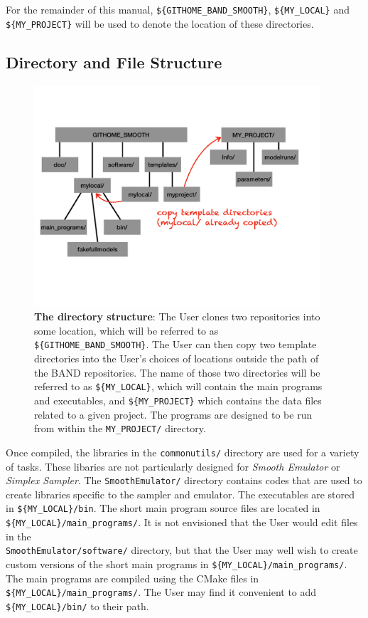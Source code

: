 \documentclass[UserManual.tex]{subfiles}
\begin{document}
For the remainder of this manual, {\tt \$\{GITHOME\_BAND\_SMOOTH\}}, {\tt \$\{MY\_LOCAL\}} and {\tt \$\{MY\_PROJECT\}} will be used to denote the location of these directories.

\subsection{Directory and File Structure}

\begin{figure}
\centerline{\includegraphics[width = 0.95\textwidth]{directorystructure}}
\caption{{\bf The directory structure}: The User clones two repositories into some location, which will be referred to as {\tt \$\{GITHOME\_BAND\_SMOOTH\}}. The User can then copy two template directories into the User's choices of locations outside the path of the BAND repositories. The name of those two directories will be referred to as {\tt \$\{MY\_LOCAL\}}, which will contain the main programs and executables, and {\tt \$\{MY\_PROJECT\}} which contains the data files related to a given project. The programs are designed to be run from within the {\tt MY\_PROJECT/} directory.}
\end{figure}

Once compiled, the libraries in the {\tt commonutils/} directory are used for a variety of tasks. These libaries are not particularly designed for {\it Smooth Emulator} or {\it Simplex Sampler}. The {\tt SmoothEmulator/} directory contains codes that are used to create libraries specific to the sampler and emulator. The executables are stored in {\tt \$\{MY\_LOCAL\}/bin}. The short main program source files are located in {\tt \$\{MY\_LOCAL\}/main\_programs/}. It is not envisioned that the User would edit files in the\\{\tt SmoothEmulator/software/} directory, but that the User may well wish to create custom versions of the short main programs in {\tt \$\{MY\_LOCAL\}/main\_programs/}. The main programs are compiled using the CMake files in {\tt \$\{MY\_LOCAL\}/main\_programs/}. The User may find it convenient to add {\tt \$\{MY\_LOCAL\}/bin/} to their path.
\end{document}
